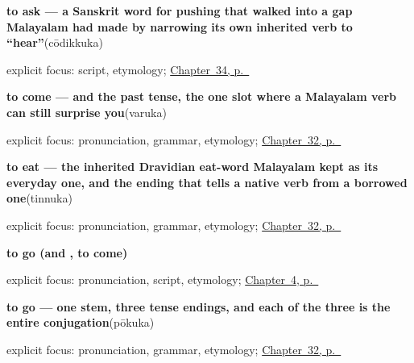 \noindent\begin{minipage}[t]{\linewidth}
\raggedright
\textbf{to ask — a Sanskrit word for pushing that walked into a gap Malayalam had made by narrowing its own inherited verb to \textquotedblleft{}hear\textquotedblright{}}\enspace\emph{}\enspace(cōdikkuka)\par
\footnotesize explicit focus: script, etymology; \hyperref[ch:ml-taking-asking-helping-liking]{Chapter~34, p.~\pageref*{ch:ml-taking-asking-helping-liking}}
\end{minipage}\par\smallskip

\noindent\begin{minipage}[t]{\linewidth}
\raggedright
\textbf{to come — and the past tense, the one slot where a Malayalam verb can still surprise you}\enspace\emph{}\enspace(varuka)\par
\footnotesize explicit focus: pronunciation, grammar, etymology; \hyperref[ch:ml-core-verbs]{Chapter~32, p.~\pageref*{ch:ml-core-verbs}}
\end{minipage}\par\smallskip

\noindent\begin{minipage}[t]{\linewidth}
\raggedright
\textbf{to eat — the inherited Dravidian eat-word Malayalam kept as its everyday one, and the ending that tells a native verb from a borrowed one}\enspace\emph{}\enspace(tinnuka)\par
\footnotesize explicit focus: pronunciation, grammar, etymology; \hyperref[ch:ml-core-verbs]{Chapter~32, p.~\pageref*{ch:ml-core-verbs}}
\end{minipage}\par\smallskip

\noindent\begin{minipage}[t]{\linewidth}
\raggedright
\textbf{to go (and , to come)}\enspace\emph{}\par
\footnotesize explicit focus: pronunciation, script, etymology; \hyperref[ch:farewells]{Chapter~4, p.~\pageref*{ch:farewells}}
\end{minipage}\par\smallskip

\noindent\begin{minipage}[t]{\linewidth}
\raggedright
\textbf{to go — one stem, three tense endings, and each of the three is the entire conjugation}\enspace\emph{}\enspace(pōkuka)\par
\footnotesize explicit focus: pronunciation, grammar, etymology; \hyperref[ch:ml-core-verbs]{Chapter~32, p.~\pageref*{ch:ml-core-verbs}}
\end{minipage}\par\smallskip

